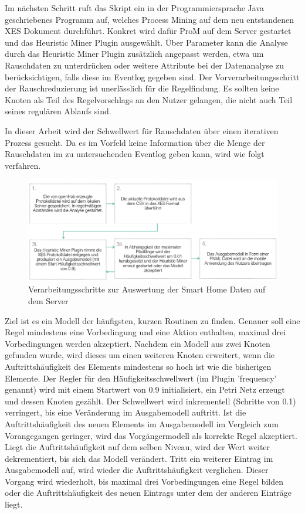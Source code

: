 Im nächsten Schritt ruft das Skript ein in der Programmiersprache Java geschriebenes Programm auf, welches Process Mining auf dem neu entstandenen XES Dokument durchführt. Konkret wird dafür ProM auf dem Server gestartet und das Heuristic Miner Plugin ausgewählt.
Über Parameter kann die Analyse durch das Heuristic Miner Plugin zusätzlich angepasst werden, etwa um Rauschdaten zu unterdrücken oder weitere Attribute bei der Datenanalyse zu berücksichtigen, falls diese im Eventlog gegeben sind. Der Vorverarbeitungsschritt der Rauschreduzierung ist unerlässlich für die Regelfindung. Es sollten keine Knoten als Teil des Regelvorschlags an den Nutzer gelangen, die nicht auch Teil seines regulären Ablaufs sind. 


In dieser Arbeit wird der Schwellwert für Rauschdaten über einen iterativen Prozess gesucht. Da es im Vorfeld keine Information über die Menge der Rauschdaten im zu untersuchenden Eventlog geben kann, wird wie folgt verfahren. 

\begin{figure}[!h]
    \centering
    \includegraphics[width=\textwidth,origin=c]{figures/Appbildungen/ServerSchritte.PNG}
    \caption{Verarbeitungsschritte zur Auswertung der Smart Home Daten auf dem Server}
    \label{fig:server}
\end{figure}

\newpage
Ziel ist es ein Modell der häufigsten, kurzen Routinen zu finden. Genauer soll eine Regel mindestens eine Vorbedingung und eine Aktion enthalten, maximal drei Vorbedingungen werden akzeptiert. Nachdem ein Modell aus zwei Knoten gefunden wurde, wird dieses um einen weiteren Knoten erweitert, wenn die Auftrittshäufigkeit des Elements mindestens so hoch ist wie die bisherigen Elemente. Der Regler für den Häufigkeitsschwellwert (im Plugin 'frequency' genannt) wird mit einem Startwert von 0.9 initialisiert, ein Petri Netz erzeugt und dessen Knoten gezählt. Der Schwellwert wird inkrementell (Schritte von 0.1) verringert, bis eine Veränderung im Ausgabemodell auftritt. Ist die Auftrittshäufigkeit des neuen Elements im Ausgabemodell im Vergleich zum Vorangegangen geringer, wird das Vorgängermodell als korrekte Regel akzeptiert. Liegt die Auftrittshäufigkeit auf dem selben Niveau, wird der Wert weiter dekrementiert, bis sich das Modell verändert. Tritt ein weiterer Eintrag im Ausgabemodell auf, wird wieder die Auftrittshäufigkeit verglichen. Dieser Vorgang wird wiederholt, bis maximal drei Vorbedingungen eine Regel bilden oder die Auftrittshäufigkeit des neuen Eintrags unter dem der anderen Einträge liegt.

